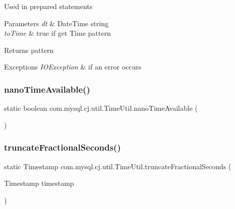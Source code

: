 Used in prepared statements


\begin{DoxyParams}{Parameters}
{\em dt} & Date\+Time string \\
\hline
{\em to\+Time} & true if get Time pattern \\
\hline
\end{DoxyParams}
\begin{DoxyReturn}{Returns}
pattern 
\end{DoxyReturn}

\begin{DoxyExceptions}{Exceptions}
{\em I\+O\+Exception} & if an error occurs \\
\hline
\end{DoxyExceptions}
\mbox{\label{classcom_1_1mysql_1_1cj_1_1util_1_1_time_util_a51171936513c71403df7272e2919783f}} 
\subsubsection{\texorpdfstring{nano\+Time\+Available()}{nanoTimeAvailable()}}
{\footnotesize\ttfamily static boolean com.\+mysql.\+cj.\+util.\+Time\+Util.\+nano\+Time\+Available (\begin{DoxyParamCaption}{ }\end{DoxyParamCaption})\hspace{0.3cm}{\ttfamily [static]}}

\mbox{\label{classcom_1_1mysql_1_1cj_1_1util_1_1_time_util_a49515b1a7c233172bd5fae6f0326c9be}} 
\subsubsection{\texorpdfstring{truncate\+Fractional\+Seconds()}{truncateFractionalSeconds()}}
{\footnotesize\ttfamily static Timestamp com.\+mysql.\+cj.\+util.\+Time\+Util.\+truncate\+Fractional\+Seconds (\begin{DoxyParamCaption}\item[{Timestamp}]{timestamp }\end{DoxyParamCaption})\hspace{0.3cm}{\ttfamily [static]}}



